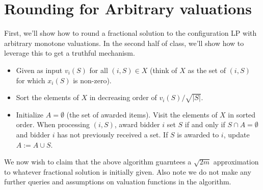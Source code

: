 \section{Rounding for Arbitrary valuations}
First, we'll show how to round a fractional solution to the configuration LP with arbitrary monotone valuations. In the second half of class, we'll show how to leverage this to get a truthful mechanism.
\begin{itemize}
\item Given as input $v_i(S)$ for all $(i, S) \in X$ (think of $X$ as the set of $(i,S)$ for which $x_i(S)$ is non-zero). 
\item Sort the elements of $X$ in decreasing order of $v_i(S)/\sqrt{|S|}$.
\item Initialize $A = \emptyset$ (the set of awarded items). Visit the elements of $X$ in sorted order. When processing $(i,S)$, award bidder $i$ set $S$ if and only if $S \cap A = \emptyset$ and bidder $i$ has not previously received a set. If $S$ is awarded to $i$, update $A := A \cup S$.
\end{itemize}

We now wish to claim that the above algorithm guarntees a $\sqrt{2m}$ approximation to whatever fractional solution is initially given. Also note we do not make any further queries and assumptions on valuation functions in the algorithm.


